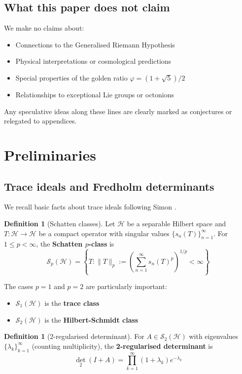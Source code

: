 \documentclass[11pt,a4paper]{article}
\theoremstyle{definition}
\newtheorem{definition}[theorem]{Definition}
\theoremstyle{remark}
\newcommand{\calS}{\mathcal{S}}
\newcommand{\calH}{\mathcal{H}}
\DeclareMathOperator{\det}{det}
\begin{document}
\subsection{What this paper does not claim}

We make no claims about:
\begin{itemize}
\item Connections to the Generalised Riemann Hypothesis
\item Physical interpretations or cosmological predictions
\item Special properties of the golden ratio $\varphi = (1+\sqrt{5})/2$
\item Relationships to exceptional Lie groups or octonions
\end{itemize}

Any speculative ideas along these lines are clearly marked as conjectures or 
relegated to appendices.

\section{Preliminaries}\label{sec:prelim}

\subsection{Trace ideals and Fredholm determinants}

We recall basic facts about trace ideals following Simon \cite{SimonTrace2005}.

\begin{definition}[Schatten classes]
Let $\calH$ be a separable Hilbert space and $T: \calH \to \calH$ be a compact operator 
with singular values $\{s_n(T)\}_{n=1}^\infty$. For $1 \leq p < \infty$, the 
\textbf{Schatten $p$-class} is
\[
\calS_p(\calH) = \left\{ T : \|T\|_p := \left(\sum_{n=1}^\infty s_n(T)^p\right)^{1/p} < \infty \right\}
\]
\end{definition}

The cases $p = 1$ and $p = 2$ are particularly important:
\begin{itemize}
\item $\calS_1(\calH)$ is the \textbf{trace class}
\item $\calS_2(\calH)$ is the \textbf{Hilbert-Schmidt class}
\end{itemize}

\begin{definition}[2-regularised determinant]
For $A \in \calS_2(\calH)$ with eigenvalues $\{\lambda_k\}_{k=1}^\infty$ (counting 
multiplicity), the \textbf{2-regularised determinant} is
\[
\det_2(I + A) = \prod_{k=1}^\infty (1 + \lambda_k) e^{-\lambda_k}
\]
\end{definition}
\end{document}
